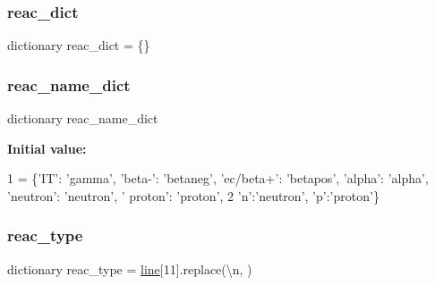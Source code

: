 \mbox{\label{namespaceconv__nndc__decaylib_a1321ce52729d2e3cb89889f3fc1d085c}} 
\subsubsection{\texorpdfstring{reac\+\_\+dict}{reac\_dict}}
{\footnotesize\ttfamily dictionary reac\+\_\+dict = \{\}}

\mbox{\label{namespaceconv__nndc__decaylib_a39ea37a41cb92bbdcfe99a0778345b67}} 
\subsubsection{\texorpdfstring{reac\+\_\+name\+\_\+dict}{reac\_name\_dict}}
{\footnotesize\ttfamily dictionary reac\+\_\+name\+\_\+dict}

{\bfseries Initial value\+:}
\begin{DoxyCode}
1 =  \{\textcolor{stringliteral}{'IT'}: \textcolor{stringliteral}{'gamma'}, \textcolor{stringliteral}{'beta-'}: \textcolor{stringliteral}{'betaneg'}, \textcolor{stringliteral}{'ec/beta+'}: \textcolor{stringliteral}{'betapos'}, \textcolor{stringliteral}{'alpha'}: \textcolor{stringliteral}{'alpha'}, \textcolor{stringliteral}{'neutron'}: \textcolor{stringliteral}{'neutron'}, \textcolor{stringliteral}{'
      proton'}: \textcolor{stringliteral}{'proton'},
2 \textcolor{stringliteral}{'n'}:\textcolor{stringliteral}{'neutron'}, \textcolor{stringliteral}{'p'}:\textcolor{stringliteral}{'proton'}\}
\end{DoxyCode}
\mbox{\label{namespaceconv__nndc__decaylib_af2a8466648ac1d845c82d9d33eff97b9}} 
\subsubsection{\texorpdfstring{reac\+\_\+type}{reac\_type}}
{\footnotesize\ttfamily dictionary reac\+\_\+type = \mbox{\hyperlink{namespaceconv__nndc__decaylib_a4fa05b1f00fcde100685cc887554b93b}{line}}\mbox{[}11\mbox{]}.replace(\textquotesingle{}\textbackslash{}n\textquotesingle{}, \textquotesingle{}\textquotesingle{})}

